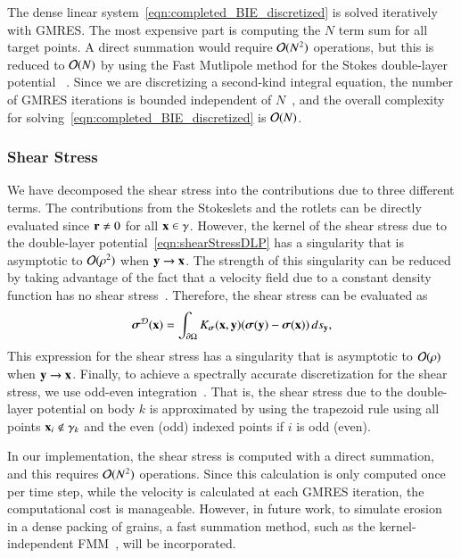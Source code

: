 \documentclass[preprint, 10pt]{elsarticle}
\begin{document}
The dense linear system~\eqref{eqn:completed_BIE_discretized} is solved
iteratively with GMRES.  The most expensive part is computing the $N$
term sum for all target points.  A direct summation would require
${\mathcal{O}}(N^2)$ operations, but this is reduced to ${\mathcal{O}}(N)$ by using the
Fast Mutlipole method for the Stokes double-layer
potential~\cite{gre-rok1987,rac-???} .  Since we are discretizing a second-kind integral
equation, the number of GMRES iterations is bounded independent of
$N$~\cite{cam-ips-kel-mey-xue1996}, and the overall complexity for
solving~\eqref{eqn:completed_BIE_discretized} is ${\mathcal{O}}(N)$.

\subsubsection{Shear Stress}
We have decomposed the shear stress into the contributions due to three
different terms.  The contributions from the Stokeslets and the rotlets
can be directly evaluated since ${\mathbf{r}} \neq 0$ for all ${\mathbf{x}} \in \gamma$.
However, the kernel of the shear stress due to the double-layer
potential~\eqref{eqn:shearStressDLP} has a singularity that is
asymptotic to ${\mathcal{O}}(\rho^2)$ when ${\mathbf{y}} \rightarrow {\mathbf{x}}$.  The strength
of this singularity can be reduced  by taking advantage of
the fact that a velocity field due to a constant density function has no
shear stress~\cite{poz1992}.  Therefore, the shear stress can be
evaluated as 
\begin{align*}
  {\boldsymbol\sigma}^{{\mathcal{D}}}({\mathbf{x}}) = \int_{{\partial}\Omega}K_{\boldsymbol\sigma}({\mathbf{x}},{\mathbf{y}})
      ({\boldsymbol\sigma}({\mathbf{y}}) - {\boldsymbol\sigma}({\mathbf{x}})) \, ds_{{\mathbf{y}}},
\end{align*}
This expression for the shear stress has a singularity that is
asymptotic to ${\mathcal{O}}(\rho)$ when ${\mathbf{y}} \rightarrow {\mathbf{x}}$.  Finally, to
achieve a spectrally accurate discretization for the shear stress, we
use odd-even integration~\cite{sid-isr1988}.  That is, the shear stress
due to the double-layer potential on body $k$ is approximated by using
the trapezoid rule using all points ${\mathbf{x}}_i \notin \gamma_k$ and the even
(odd) indexed points if $i$ is odd (even).

In our implementation, the shear stress is computed with a direct
summation, and this requires ${\mathcal{O}}(N^2)$ operations.  Since this
calculation is only computed once per time step, while the velocity is
calculated at each GMRES iteration, the computational cost is
manageable.  However, in future work, to simulate erosion in a
dense packing of grains, a fast summation method, such as the
kernel-independent FMM~\cite{yin-bir-zor2004}, will be incorporated. 
\end{document}
